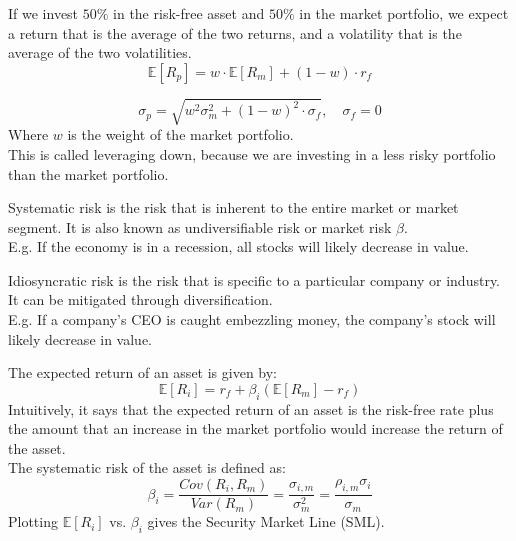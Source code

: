 \begin{proposition}
    [Leveraging]
    If we invest $50\%$ in the risk-free asset and $50\%$ in the market portfolio, we expect a return that is the average of the two returns, and a volatility that is the average of the two volatilities.\\
    \begin{equation}
        \mathbb{E}[R_{p}] = w\cdot \mathbb{E}[R_{m}] + (1-w)\cdot r_f
    \end{equation}

    \begin{equation}
        \sigma_{p} = \sqrt{w^2 \sigma_{m}^2 + (1-w)^2 \cdot \sigma_{f}}, \quad \sigma_{f} = 0
    \end{equation}
    Where $w$ is the weight of the market portfolio.\\
    This is called leveraging down, because we are investing in a less risky portfolio than the market portfolio.\\
\end{proposition}
\begin{definition}
    Systematic risk is the risk that is inherent to the entire market or market segment. It is also known as undiversifiable risk or market risk $\beta$.\\
    E.g. If the economy is in a recession, all stocks will likely decrease in value.\\
\end{definition}

\begin{definition}
    Idiosyncratic risk is the risk that is specific to a particular company or industry. It can be mitigated through diversification.\\
    E.g. If a company's CEO is caught embezzling money, the company's stock will likely decrease in value.\\
\end{definition}



\begin{theorem}
    The expected return of an asset is given by:
    \begin{equation}
        \mathbb{E}[R_i] = r_f + \beta_i(\mathbb{E}[R_m] - r_f)
    \end{equation}
    Intuitively, it says that the expected return of an asset is the risk-free rate plus the amount that an increase in the market portfolio would increase the return of the asset.\\
    The systematic risk of the asset is defined as:
    \begin{equation}
        \beta_i = \frac{Cov(R_i,R_m)}{Var(R_m)} = \frac{\sigma_{i,m}}{\sigma_{m}^2} = \frac{\rho_{i,m} \sigma_i}{\sigma_{m}}
    \end{equation}
    Plotting $\mathbb{E}[R_i]$ vs. $\beta_i$ gives the Security Market Line (SML).\\
\end{theorem}

